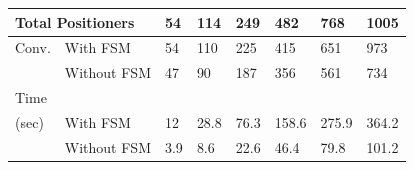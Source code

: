 \documentclass[]{spie}  %
\begin{document}
\begin{figure}[H]
\begin{minipage}{7.5cm}
{				\tiny
				\begin{tabular}{|l|l|l|l|l|l|l|l|}
					\hline
					\multicolumn{2}{|l|}{Total Positioners}  & 54 & 114 & 249 & 482 & 768 & 1005\\
					\hline
					Conv. & With FSM  & 54 & 110 & 225 & 415 & 651 & 973 \\
					\cline{2-8}
					& Without FSM & 47  & 90 & 187 & 356 & 561 & 734 \\
					\hline
					Time\\(sec) & With FSM  & 12 & 28.8 & 76.3 & 158.6 & 275.9 & 364.2 \\
					\cline{2-8}
					& Without FSM  & 3.9  & 8.6 & 22.6 & 46.4 & 79.8  & 101.2 \\
					\hline
				\end{tabular}
				}
				\label{configuration6_result} 
			\end{minipage}
		\end{figure}
\end{document}
